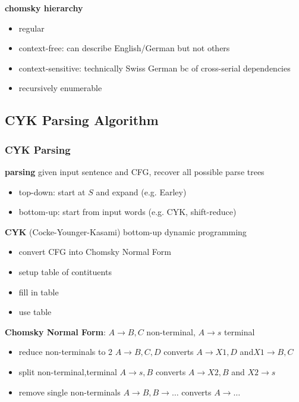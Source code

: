 \documentclass[]{article}
\theoremstyle{definition}
\begin{document}
\textbf{chomsky hierarchy}
\begin{itemize}
    \item regular
    \item context-free: can describe English/German but not others
    \item context-sensitive: technically Swiss German bc of cross-serial dependencies
    \item recursively enumerable
\end{itemize}

\subsection{CYK Parsing Algorithm}%
\label{sub:cyk_parsing_algorithm}

\subsubsection{CYK Parsing}%
\label{ssub:cyk_parsing}

\textbf{parsing} given input sentence and CFG, recover all possible parse trees
\begin{itemize}
    \item top-down: start at $S$ and expand (e.g. Earley)
    \item bottom-up: start from input words (e.g. CYK, shift-reduce)
\end{itemize}

\textbf{CYK} (Cocke-Younger-Kasami) bottom-up dynamic programming
\begin{itemize}
    \item convert CFG into Chomsky Normal Form
    \item setup table of contituents
    \item fill in table
    \item use table
\end{itemize}

\textbf{Chomsky Normal Form}: $A \to B,C$ non-terminal, $A \to s$ terminal
\begin{itemize}
    \item reduce non-terminals to 2 $A \to B,C,D$ converts $A \to X1,D$ and$X1 \to B,C $
    \item split non-terminal,terminal $A \to s,B$ converts $A \to X2,B$ and $X2 \to s$
    \item remove single non-terminals $A \to B, B \to \ldots$ converts $A \to \ldots$
\end{itemize}
\end{document}
